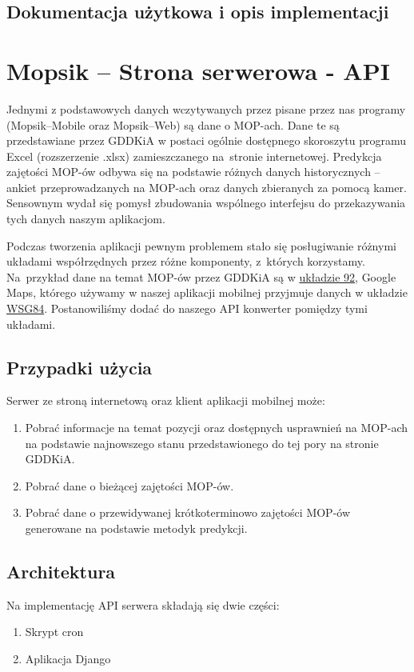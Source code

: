 \section{Dokumentacja użytkowa i opis implementacji}

\chapter{Mopsik -- Strona serwerowa - API}\label{r:apka} 

Jednymi z podstawowych danych wczytywanych przez pisane przez nas programy (Mopsik--Mobile oraz Mopsik--Web) są dane o MOP-ach. Dane te są przedstawiane przez GDDKiA w postaci ogólnie dostępnego skoroszytu programu Excel (rozszerzenie .xlsx) zamieszczanego na~stronie internetowej.
Predykcja zajętości MOP-ów odbywa się na podstawie różnych danych historycznych -- ankiet przeprowadzanych na MOP-ach oraz danych zbieranych za pomocą kamer.
Sensownym wydał się pomysł zbudowania wspólnego interfejsu do przekazywania tych danych naszym aplikacjom. 

Podczas tworzenia aplikacji pewnym problemem stało się posługiwanie różnymi układami współrzędnych przez różne komponenty, z~których korzystamy. Na~przykład dane na temat MOP-ów przez GDDKiA są w \href{https://pl.wikipedia.org/wiki/Uk\%C5\%82ad_wsp\%C3\%B3\%C5\%82rz\%C4\%99dnych_1992}{układzie 92}, Google Maps, którego używamy w naszej aplikacji mobilnej przyjmuje danych w układzie \href{https://pl.wikipedia.org/wiki/System_odniesienia_WGS_84}{WSG84}. Postanowiliśmy dodać do naszego API konwerter pomiędzy tymi układami.
\section{Przypadki użycia}
Serwer ze stroną internetową oraz klient aplikacji mobilnej może:
\begin{enumerate}
\item Pobrać informacje na temat pozycji oraz dostępnych usprawnień na MOP-ach na podstawie najnowszego stanu przedstawionego do tej pory na stronie GDDKiA.
\item Pobrać dane o bieżącej zajętości MOP-ów.
\item Pobrać dane o przewidywanej krótkoterminowo zajętości MOP-ów generowane na podstawie metodyk predykcji.
\end{enumerate}
\section{Architektura}
Na implementację API serwera składają się dwie części:
\begin{enumerate}
\item Skrypt cron
\item Aplikacja Django
\end{enumerate}
